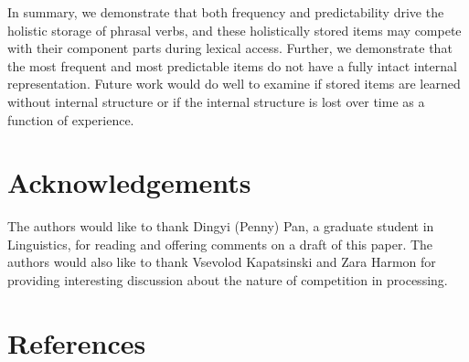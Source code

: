\documentclass[
  man,floatsintext]{apa6}
\begin{document}
In summary, we demonstrate that both frequency and predictability drive the holistic storage of phrasal verbs, and these holistically stored items may compete with their component parts during lexical access. Further, we demonstrate that the most frequent and most predictable items do not have a fully intact internal representation. Future work would do well to examine if stored items are learned without internal structure or if the internal structure is lost over time as a function of experience.

\hypertarget{acknowledgements}{%
\section{Acknowledgements}\label{acknowledgements}}

The authors would like to thank Dingyi (Penny) Pan, a graduate student in Linguistics, for reading and offering comments on a draft of this paper. The authors would also like to thank Vsevolod Kapatsinski and Zara Harmon for providing interesting discussion about the nature of competition in processing.

\newpage

\hypertarget{references}{%
\section{References}\label{references}}
\end{document}
